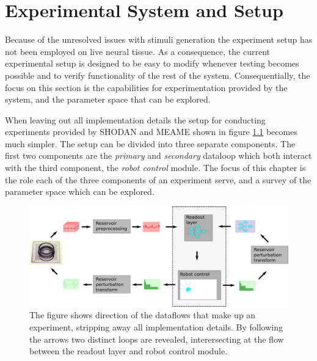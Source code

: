 \chapter{Experimental System and Setup}
Because of the unresolved issues with stimuli generation the experiment setup has not been
employed on live neural tissue.
As a consequence, the current experimental setup is designed to be easy to
modify whenever testing becomes possible and to verify functionality of the rest
of the system.
Consequentially, the focus on this section is the capabilities for experimentation
provided by the system, and the parameter space that can be explored.\par
%
When leaving out all implementation details the setup for conducting experiments
provided by SHODAN and MEAME shown in figure \ref{figExperimentLoop} becomes much simpler.
The setup can be divided into three separate components.
The first two components are the \emph{primary} and \emph{secondary} dataloop
which both interact with the third component, the \emph{robot control} module.
The focus of this chapter is the role each of the three components of an
experiment serve, and a survey of the parameter space which can be explored. 
\begin{figure}[h!]
  \centering
  \includegraphics[width=1\textwidth]{fig/experimentLoopFull.png}
  \caption{
    The figure shows direction of the dataflows that make up an experiment,
    stripping away all implementation details.
    By following the arrows two distinct loops are revealed, interersecting at
    the flow between the readout layer and robot control module.
  }
  \label{figExperimentLoop}
\end{figure}
%
